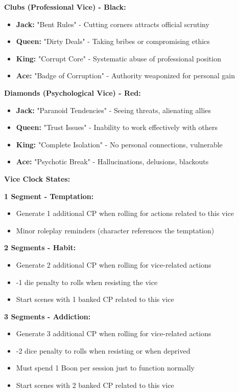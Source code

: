 \documentclass[11pt]{article}
\begin{document}
\textbf{Clubs (Professional Vice) - Black:}
\begin{itemize}
    \item \textbf{Jack:} "Bent Rules" - Cutting corners attracts official scrutiny
    \item \textbf{Queen:} "Dirty Deals" - Taking bribes or compromising ethics
    \item \textbf{King:} "Corrupt Core" - Systematic abuse of professional position
    \item \textbf{Ace:} "Badge of Corruption" - Authority weaponized for personal gain
\end{itemize}

\textbf{Diamonds (Psychological Vice) - Red:}
\begin{itemize}
    \item \textbf{Jack:} "Paranoid Tendencies" - Seeing threats, alienating allies
    \item \textbf{Queen:} "Trust Issues" - Inability to work effectively with others
    \item \textbf{King:} "Complete Isolation" - No personal connections, vulnerable
    \item \textbf{Ace:} "Psychotic Break" - Hallucinations, delusions, blackouts
\end{itemize}

\textbf{Vice Clock States:}

\textbf{1 Segment - Temptation:}
\begin{itemize}
    \item Generate 1 additional CP when rolling for actions related to this vice
    \item Minor roleplay reminders (character references the temptation)
\end{itemize}

\textbf{2 Segments - Habit:}
\begin{itemize}
    \item Generate 2 additional CP when rolling for vice-related actions
    \item -1 die penalty to rolls when resisting the vice
    \item Start scenes with 1 banked CP related to this vice
\end{itemize}

\textbf{3 Segments - Addiction:}
\begin{itemize}
    \item Generate 3 additional CP when rolling for vice-related actions
    \item -2 dice penalty to rolls when resisting or when deprived
    \item Must spend 1 Boon per session just to function normally
    \item Start scenes with 2 banked CP related to this vice
\end{itemize}
\end{document}
